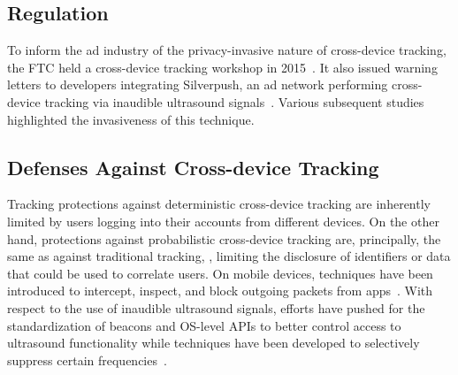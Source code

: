 \subsection{Regulation}

To inform the ad industry of the privacy-invasive nature of cross-device tracking, the FTC held a cross-device tracking workshop in 2015~\cite{ftcCrossDeviceTracking2015}. It also issued warning letters to developers integrating Silverpush, an ad network performing cross-device tracking via inaudible ultrasound signals~\cite{ftcFTCIssuesWarning2016}. Various subsequent studies~\cite{mavroudisPrivacySecurityUltrasound2017,arpPrivacyThreatsUltrasonic2017,matyuninTrackingPrivateBrowsing2018} highlighted the invasiveness of this technique. 

\subsection{Defenses Against Cross-device Tracking}

Tracking protections against deterministic cross-device tracking are inherently limited by users logging into their accounts from different devices. On the other hand, protections against probabilistic cross-device tracking are, principally, the same as against traditional tracking, \eg{}, limiting the disclosure of identifiers or data that could be used to correlate users. 
On mobile devices, techniques have been introduced to intercept, inspect, and block outgoing packets from apps~\cite{shubaNoMoAdsEffectiveEfficient2018}. With respect to the use of inaudible ultrasound signals, efforts have pushed for the standardization of beacons and OS-level APIs to better control access to ultrasound functionality while techniques have been developed to selectively suppress certain frequencies~\cite{mavroudisPrivacySecurityUltrasound2017}.

